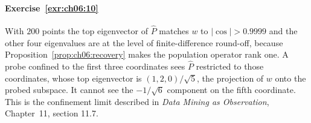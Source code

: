 \paragraph{Exercise~\ref{exr:ch06:10}}
With $200$ points the top eigenvector of $\hat P$ matches $w$ to $|\cos|>0.9999$ and the other four eigenvalues are at the level of finite-difference round-off, because Proposition~\ref{prop:ch06:recovery} makes the population operator rank one. A probe confined to the first three coordinates sees $\hat P$ restricted to those coordinates, whose top eigenvector is $(1,2,0)/\sqrt5$, the projection of $w$ onto the probed subspace. It cannot see the $-1/\sqrt6$ component on the fifth coordinate. This is the confinement limit described in \emph{Data Mining as Observation}, Chapter~11, section 11.7.

